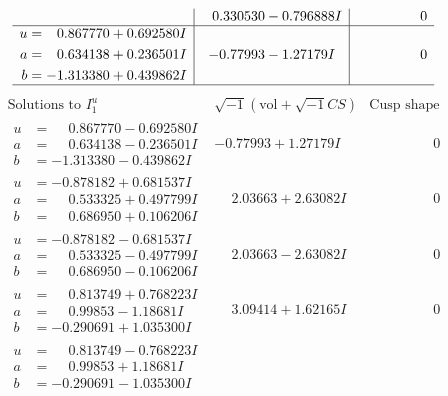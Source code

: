 \documentclass[1p]{elsarticle_modified}
\theoremstyle{definition}
\newcommand{\I}{\sqrt{-1}}
\begin{document}
$$\begin{array}{c|c|c}
 & \phantom{-}0.330530 - 0.796888 I & \phantom{-0.000000 } 0 \\ \hline\begin{aligned}
u &= \phantom{-}0.867770 + 0.692580 I \\
a &= \phantom{-}0.634138 + 0.236501 I \\
b &= -1.313380 + 0.439862 I\end{aligned}
 & -0.77993 - 1.27179 I & \phantom{-0.000000 } 0\\
 \hline 
 \end{array}$$\newpage$$\begin{array}{c|c|c}  
\text{Solutions to }I^u_{1}& \I (\text{vol} + \sqrt{-1}CS) & \text{Cusp shape}\\
 \hline 
\begin{aligned}
u &= \phantom{-}0.867770 - 0.692580 I \\
a &= \phantom{-}0.634138 - 0.236501 I \\
b &= -1.313380 - 0.439862 I\end{aligned}
 & -0.77993 + 1.27179 I & \phantom{-0.000000 } 0 \\ \hline\begin{aligned}
u &= -0.878182 + 0.681537 I \\
a &= \phantom{-}0.533325 + 0.497799 I \\
b &= \phantom{-}0.686950 + 0.106206 I\end{aligned}
 & \phantom{-}2.03663 + 2.63082 I & \phantom{-0.000000 } 0 \\ \hline\begin{aligned}
u &= -0.878182 - 0.681537 I \\
a &= \phantom{-}0.533325 - 0.497799 I \\
b &= \phantom{-}0.686950 - 0.106206 I\end{aligned}
 & \phantom{-}2.03663 - 2.63082 I & \phantom{-0.000000 } 0 \\ \hline\begin{aligned}
u &= \phantom{-}0.813749 + 0.768223 I \\
a &= \phantom{-}0.99853 - 1.18681 I \\
b &= -0.290691 + 1.035300 I\end{aligned}
 & \phantom{-}3.09414 + 1.62165 I & \phantom{-0.000000 } 0 \\ \hline\begin{aligned}
u &= \phantom{-}0.813749 - 0.768223 I \\
a &= \phantom{-}0.99853 + 1.18681 I \\
b &= -0.290691 - 1.035300 I\end{aligned}

\end{array}$$
\end{document}
